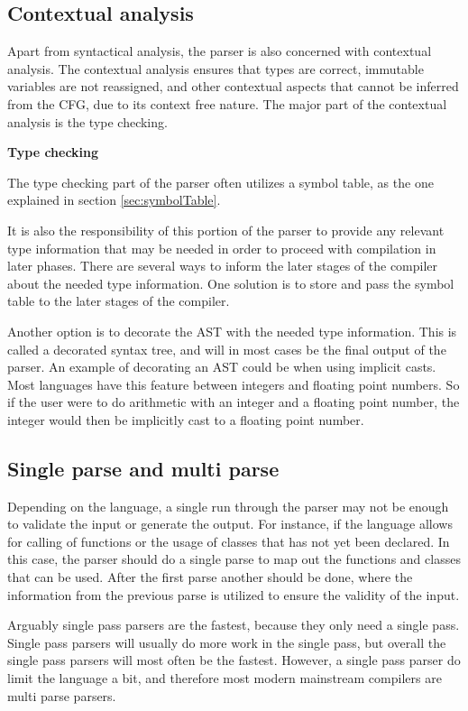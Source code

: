 \subsection{Contextual analysis}

Apart from syntactical analysis, the parser is also concerned with contextual analysis. 
The contextual analysis ensures that types are correct, immutable variables are not reassigned, and other contextual aspects that cannot be inferred from the CFG, due to its context free nature. 
The major part of the contextual analysis is the type checking.

\textbf{Type checking}

The type checking part of the parser often utilizes a symbol table, as the one explained in section \ref{sec:symbolTable}.

It is also the responsibility of this portion of the parser to provide any relevant type information that may be needed in order to proceed with compilation in later phases. 
There are several ways to inform the later stages of the compiler about the needed type information. 
One solution is to store and pass the symbol table to the later stages of the compiler. 

Another option is to decorate the AST with the needed type information. 
This is called a decorated syntax tree, and will in most cases be the final output of the parser.
An example of decorating an AST could be when using implicit casts. 
Most languages have this feature between integers and floating point numbers. 
So if the user were to do arithmetic with an integer and a floating point number, the integer would then be implicitly cast to a floating point number.

\subsection{Single parse and multi parse}

Depending on the language, a single run through the parser may not be enough to validate the input or generate the output. 
For instance, if the language allows for calling of functions or the usage of classes that has not yet been declared.
In this case, the parser should do a single parse to map out the functions and classes that can be used. 
After the first parse another should be done, where the information from the previous parse is utilized to ensure the validity of the input. 

Arguably single pass parsers are the fastest, because they only need a single pass. 
Single pass parsers will usually do more work in the single pass, but overall the single pass parsers will most often be the fastest.
However, a single pass parser do limit the language a bit, and therefore most modern mainstream compilers are multi parse parsers.

